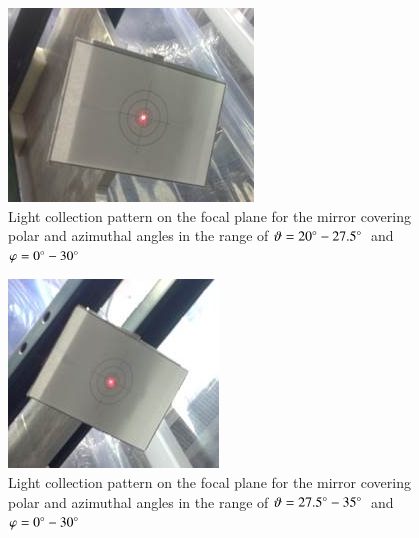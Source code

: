 \begin{figure}[!h]
    \centering
    \includegraphics[width=1.0\linewidth]{Focal_Plane_2.jpg}
    \caption{Light collection pattern on the focal plane for the mirror covering polar and azimuthal angles in the range of $\vartheta = 20\degree - 27.5\degree$\, and\, $\varphi = 0\degree - 30\degree$}
    \label{fig:Focal_Plane_2}
\end{figure}{}
\begin{figure}[!h]
    \centering
    \includegraphics[width=1.0\linewidth]{Focal_Plane_1R.jpg}
    \caption{Light collection pattern on the focal plane for the mirror covering polar and azimuthal angles in the range of $\vartheta = 27.5\degree - 35\degree$\, and\, $\varphi = 0\degree - 30\degree$}
    \label{fig:Focal_Plane_1R}
\end{figure}{}


